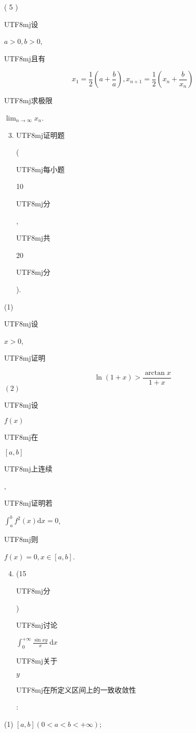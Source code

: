 \documentclass[10pt]{article}
\begin{document}
( 5 ) \begin{CJK}{UTF8}{mj}设\end{CJK} $a>0, b>0$, \begin{CJK}{UTF8}{mj}且有\end{CJK}
$$
x_{1}=\frac{1}{2}\left(a+\frac{b}{a}\right), x_{n+1}=\frac{1}{2}\left(x_{n}+\frac{b}{x_{n}}\right)
$$
\begin{CJK}{UTF8}{mj}求极限\end{CJK} $\lim _{n \rightarrow \infty} x_{n}$.

\begin{enumerate}
  \setcounter{enumi}{2}
  \item \begin{CJK}{UTF8}{mj}证明题\end{CJK}(\begin{CJK}{UTF8}{mj}每小题\end{CJK} 10 \begin{CJK}{UTF8}{mj}分\end{CJK}, \begin{CJK}{UTF8}{mj}共\end{CJK} 20 \begin{CJK}{UTF8}{mj}分\end{CJK}).
\end{enumerate}
(1) \begin{CJK}{UTF8}{mj}设\end{CJK} $x>0$, \begin{CJK}{UTF8}{mj}证明\end{CJK}
$$
\ln (1+x)>\frac{\arctan x}{1+x}
$$
$(2)$ \begin{CJK}{UTF8}{mj}设\end{CJK} $f(x)$ \begin{CJK}{UTF8}{mj}在\end{CJK} $[a, b]$ \begin{CJK}{UTF8}{mj}上连续\end{CJK}, \begin{CJK}{UTF8}{mj}证明若\end{CJK} $\int_{a}^{b} f^{2}(x) \mathrm{d} x=0$, \begin{CJK}{UTF8}{mj}则\end{CJK} $f(x)=0, x \in[a, b]$.

\begin{enumerate}
  \setcounter{enumi}{3}
  \item (15 \begin{CJK}{UTF8}{mj}分\end{CJK}) \begin{CJK}{UTF8}{mj}讨论\end{CJK} $\int_{0}^{+\infty} \frac{\sin x y}{x} \mathrm{~d} x$ \begin{CJK}{UTF8}{mj}关于\end{CJK} $y$ \begin{CJK}{UTF8}{mj}在所定义区间上的一致收敛性\end{CJK}:
\end{enumerate}
(1) $[a, b](0<a<b<+\infty)$;
\end{document}
